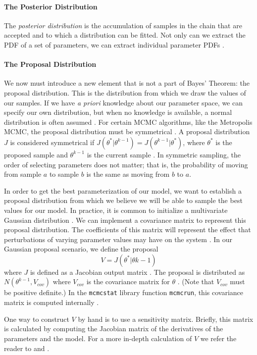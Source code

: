 \paragraph{The Posterior Distribution} The \emph{posterior distribution} is the accumulation of samples in the chain that are accepted and to which a distribution can be fitted. Not only can we extract the PDF of a set of parameters, we can extract individual parameter PDFs \cite{astrostats}.
\paragraph{The Proposal Distribution} We now must introduce a new element that is not a part of Bayes' Theorem: the proposal distribution. This is the distribution from which we draw the values of our samples. If we have \textit{a priori} knowledge about our parameter space, we can specify our own distribution, but when no knowledge is available, a normal distribution is often assumed \cite{astrostats} \cite{bayesprior}. For certain MCMC algorithms, like the Metropolis MCMC, the proposal distribution must be symmetrical \cite{smithCh8}. A proposal distribution $J$ is considered symmetrical if $J(\theta^{*}|\theta^{k-1}) = J(\theta^{k-1}|\theta^{*})$, where $\theta^*$ is the proposed sample and $\theta^{k-1}$ is the current sample \cite{smithCh8}. In symmetric sampling, the order of selecting parameters does not matter; that is, the probability of moving from sample $a$ to sample $b$ is the same as moving from $b$ to $a$.
\par In order to get the best parameterization of our model, we want to establish a proposal distribution from which we believe we will be able to sample the best values for our model. In practice, it is common to initialize a multivariate Gaussian distribution \cite{astrostats} \cite{mcmcstatlib}. We can implement a covariance matrix to represent this proposal distribution. The coefficients of this matrix will represent the effect that perturbations of varying parameter values may have on the system \cite{sensitivity_matrices1}. In our Gaussian proposal scenario, we define the proposal 
\begin{equation} \label{eq:8mcmc}
V = J(\theta^*|\theta{k-1})
\end{equation}
where $J$ is defined as a Jacobian output matrix \cite{sensitivity_matrices1} \cite{smithCh8}. The proposal is distributed as $N(\theta^{k-1}, V_{cov})$ where $V_{cov}$ is the covariance matrix for $\theta$ \cite{smithCh8}. (Note that $V_{cov}$ must be positive definite.) In the \texttt{mcmcstat} library function \texttt{mcmcrun}, this covariance matrix is computed internally \cite{mcmcstatlib}.
\par One way to construct $V$ by hand is to use a sensitivity matrix. Briefly, this matrix is calculated by computing the Jacobian matrix of the derivatives of the parameters and the model. For a more in-depth calculation of $V$ we refer the reader to \cite{smithCh8} and \cite{sensitivity_matrices1}.
